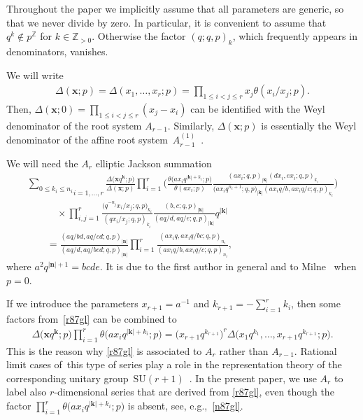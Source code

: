 \documentclass[pdftex]{sigma}%
\numberwithin{equation}{section}
\def\ta{\theta}
\newcommand\bn{\mathbf n}
\newcommand\bk{\mathbf k}
\begin{document}
Throughout the paper we implicitly assume that all parameters are generic, so that we never divide by zero. In particular, it is convenient to assume that $q^k\notin p^{\mathbb Z}$ for $k\in\mathbb Z_{> 0}$. Otherwise the factor $(q;q,p)_k$, which frequently appears in denominators, vanishes.

We will write
\begin{gather*}
\Delta(\mathbf x;p)=\Delta(x_1,\dots,x_r;p)=\prod\limits_{1\leq i<j\leq r} x_j\theta(x_i/x_j;p).
\end{gather*}
Then, $\Delta(\mathbf x;0)=\prod_{1\leq i<j\leq r} (x_j-x_i)$ can be identified with the Weyl denominator of the root system $A_{r-1}$. Similarly,
$\Delta(\mathbf x;p)$ is essentially the Weyl denominator of the affine root system~$A_{r-1}^{(1)}$~\cite{mac}.

 We will need the $A_r$ elliptic Jackson summation
\begin{gather}
\underset{i=1,\dots,r}{\sum_{0\le k_i\le n_i}}
\frac{\Delta\big(\mathbf x q^{\mathbf k};p\big)}{\Delta(\mathbf x;p)}
\prod\limits_{i=1}^r\bigg(\frac{\ta\big(ax_iq^{|\bk|+k_i};p\big)}{\ta(ax_i;p)}\frac{(ax_i;q,p)_{|\bk|} (dx_i,ex_i;q,p)_{k_i}}
{\big(ax_iq^{n_i+1};q,p\big)_{|\bk|} (ax_iq/b,ax_iq/c;q,p)_{k_i}}\bigg)\nonumber
\\ \qquad\quad{}
\times
\prod\limits_{i,j=1}^r\frac{\big(q^{-n_j}x_i/x_j;q,p\big)_{k_i}}{(qx_i/x_j;q,p)_{k_i}}
\frac{(b,c;q,p)_{|\bk|}}{(aq/d,aq/e;q,p)_{|\bk|}}
q^{|\mathbf k|}\nonumber
\\ \qquad{}\label{r87gl}
=
\frac{(aq/bd,aq/cd;q,p)_{|\bn|}}{(aq/d,aq/bcd;q,p)_{|\bn|}}
\prod\limits_{i=1}^r\frac{(ax_iq,ax_iq/bc;q,p)_{n_i}}{(ax_iq/b,ax_iq/c;q,p)_{n_i}},
\end{gather}
where $a^2q^{|\mathbf n|+1}=bcde$. It is
due to the first author \cite[Corollary~5.3]{r} in general and to Milne~\cite{m} when $p=0$.

If we introduce the parameters $x_{r+1}=a^{-1}$ and $k_{r+1}=-\sum_{i=1}^r k_i$, then some factors from~\eqref{r87gl} can be combined to
\begin{gather*}
\Delta\big(\mathbf x q^{\mathbf k};p\big)\prod\limits_{i=1}^r\ta\big(ax_iq^{|\bk|+k_i};p\big)
=\big(x_{r+1}q^{k_{r+1}}\big)^r\Delta\big(x_1q^{k_1},\dots,x_{r+1}q^{k_{r+1}};p\big).
\end{gather*}
This is the reason why \eqref{r87gl} is associated to $A_r$ rather than $A_{r-1}$.
Rational limit cases of~this type of series play a role in
the representation theory of the corresponding unitary group~$\mathrm{SU}(r+1)$~\cite{hbl}.
In the present paper, we use $A_r$ to label also $r$-dimensional series that are derived from \eqref{r87gl}, even though
 the factor $\prod_{i=1}^r\ta\big(ax_iq^{|\bk|+k_i};p\big)$ is absent, see, e.g.,~\eqref{n87gl}.
\end{document}
